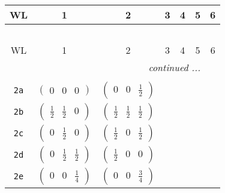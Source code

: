 \documentclass[fleqn,9pt,landscape]{jsarticle}
\begin{document}
\begin{center}
\renewcommand{\arraystretch}{1.2}
\begin{longtable}{ccccccc}
 \hline \hline
WL & 1 & 2 & 3 & 4 & 5 & 6 \\ \hline \endfirsthead

\multicolumn{6}{l}{\tablename\ \thetable{}} \\
 \hline \hline
WL & 1 & 2 & 3 & 4 & 5 & 6 \\ \hline \endhead

 \hline \hline
\multicolumn{6}{r}{\footnotesize\it continued ...} \\ \endfoot

 \hline \hline
\multicolumn{6}{r}{} \\ \endlastfoot

{\tt 2a} & $ \begin{pmatrix} 0 & 0 & 0 \end{pmatrix} $ & $ \begin{pmatrix} 0 & 0 & \frac{1}{2} \end{pmatrix} $ & $  $ & $  $ & $  $ & $  $ \\ \hline
{\tt 2b} & $ \begin{pmatrix} \frac{1}{2} & \frac{1}{2} & 0 \end{pmatrix} $ & $ \begin{pmatrix} \frac{1}{2} & \frac{1}{2} & \frac{1}{2} \end{pmatrix} $ & $  $ & $  $ & $  $ & $  $ \\ \hline
{\tt 2c} & $ \begin{pmatrix} 0 & \frac{1}{2} & 0 \end{pmatrix} $ & $ \begin{pmatrix} \frac{1}{2} & 0 & \frac{1}{2} \end{pmatrix} $ & $  $ & $  $ & $  $ & $  $ \\ \hline
{\tt 2d} & $ \begin{pmatrix} 0 & \frac{1}{2} & \frac{1}{2} \end{pmatrix} $ & $ \begin{pmatrix} \frac{1}{2} & 0 & 0 \end{pmatrix} $ & $  $ & $  $ & $  $ & $  $ \\ \hline
{\tt 2e} & $ \begin{pmatrix} 0 & 0 & \frac{1}{4} \end{pmatrix} $ & $ \begin{pmatrix} 0 & 0 & \frac{3}{4} \end{pmatrix} $ & $  $ & $  $ & $  $ & $  $ \\ \hline

\end{longtable}
\end{center}
\end{document}
